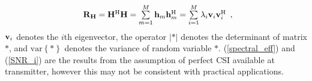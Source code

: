 \documentclass[10pt,fleqn, twocolumn]{IEEEtran}
\newcommand{\bh}{{\bf h}}
\newcommand{\bH}{{\bf H}}
\newcommand{\bv}{{\bf v}}
\newcommand{\bR}{{\bf R}}
\begin{document}
\begin{equation}
\begin{array}{l}
\bR_{\bH}=\bH^{\rm H}\bH=\sum\limits_{m=1}^{M}\bh_{m}\bh_{m}^{\rm
H}=\sum\limits_{i=1}^{M}\lambda_{i}\bv_{i}\bv_{i}^{\rm H}
\end{array},\label{R_h}
\end{equation}
\noindent $\bv_{i}$ denotes the $i$th eigenvector, the operator
$\left|\ast\right|$ denotes the determinant of matrix $\ast$, and
$\mbox{var}\left\{\ast\right\}$ denotes the variance of random
variable $\ast$. (\ref{spectral_eff}) and (\ref{SNR_i}) are the
results from the assumption of perfect CSI available at
transmitter, however this may not be consistent with practical
applications.
\begin{figure}
\end{figure}
\end{document}
